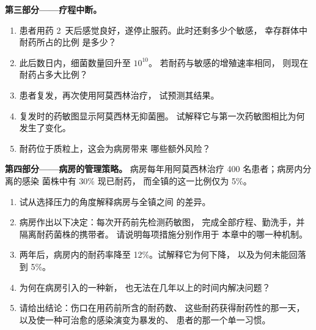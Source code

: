 \begin{problem}
\medskip
\noindent\textbf{第三部分——疗程中断。}
\begin{enumerate}[resume]
  \item 患者用药 \num{2}~天后感觉良好，遂停止服药。此时还剩多少个敏感，
        幸存群体中耐药所占的比例
        是多少？
  \item 此后数日内，细菌数量回升至 $10^{10}$。
        若耐药与敏感的增殖速率相同，
        则现在耐药占多大比例？
  \item 患者复发，再次使用阿莫西林治疗，
        试预测其结果。
  \item 复发时的药敏图显示阿莫西林无抑菌圈。
        试解释它与第一次药敏图相比为何发生了变化。
  \item 耐药位于质粒上，这会为病房带来
        哪些额外风险？
\end{enumerate}

\medskip
\noindent\textbf{第四部分——病房的管理策略。}
病房每年用阿莫西林治疗 400 名患者；病房内分离的感染
菌株中有 30\% 现已耐药，
而全镇的这一比例仅为 5\%。
\begin{enumerate}[resume]
  \item 试从选择压力的角度解释病房与全镇之间
        的差异。
  \item 病房作出以下决定：每次开药前先检测药敏图，
        完成全部疗程、勤洗手，并隔离耐药菌株的携带者。
        请说明每项措施分别作用于
        本章中的哪一种机制。
  \item 两年后，病房内的耐药率降至 12\%。试解释它为何下降，
        以及为何未能回落到 5\%。
  \item 为何在病房引入的一种新，
        也无法在几年以上的时间内解决问题？
  \item 请给出结论：伤口在用药前所含的耐药数、
        这些耐药获得耐药性的那一天，
        以及使一种可治愈的感染演变为暴发的、
        患者的那一个单一习惯。
\end{enumerate}
\end{problem}
